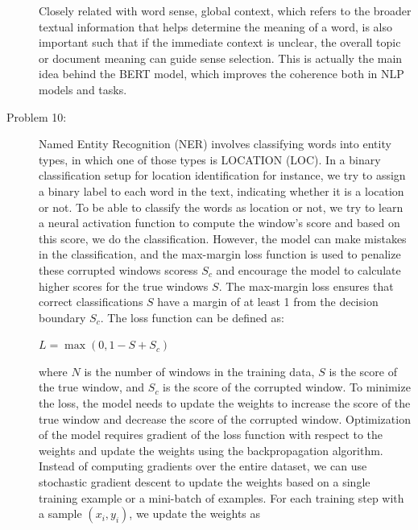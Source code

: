 \documentclass[12pt]{article}
\begin{document}
\begin{description}
\begin{enumerate}
  \end{enumerate}

  Closely related with word sense, global context, which refers to the broader textual information that helps determine the meaning of a word, is also important such that
  if the immediate context is unclear, the overall topic or document meaning can guide sense selection. This is actually the main idea behind the BERT model, which improves
  the coherence both in NLP models and tasks.

  \pagebreak

  \item[Problem 10:] \hfill %
  
  Named Entity Recognition (NER) involves classifying words into entity types, in which one of those types is LOCATION (LOC). In a binary classification setup for 
  location identification for instance, we try to assign a binary label to each word in the text, indicating whether it is a location or not. To be able to classify the words as location
  or not, we try to learn a neural activation function to compute the window's score and based on this score, we do the classification. However, the model can make mistakes
  in the classification, and the max-margin loss function is used to penalize these corrupted windows scoress $S_c$ and encourage the model to calculate higher scores for the 
  true windows $S$. The max-margin loss ensures that correct classifications $S$ have a margin of at least 1 from the decision boundary $S_c$. The loss function can be defined as:

  \begin{center}
    $\displaystyle{L = \max(0, 1 - S + S_c)}$
  \end{center}
  
  where $N$ is the number of windows in the training data, $S$ is the score of the true window, and $S_c$ is the score of the corrupted window. To minimize the loss, the model
  needs to update the weights to increase the score of the true window and decrease the score of the corrupted window. Optimization of the model requires gradient of the loss 
  function with respect to the weights and update the weights using the backpropagation algorithm. Instead of computing gradients over the entire dataset, we can use stochastic
  gradient descent to update the weights based on a single training example or a mini-batch of examples. For each training step with a sample $(x_i, y_i)$, we update the weights
  as


\end{description}
\end{document}
